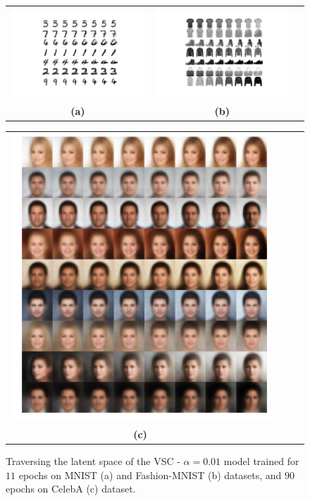 \begin{figure}[!h]
    \captionsetup{justification=centering,margin=0.3cm}
    \centering
    \begin{tabular}{ccc}
        \includegraphics[width=.47\textwidth]{figures/Mnist-traversal} &
        \includegraphics[width=.47\textwidth]{figures/Fashion-traversal} \\
        \textbf{(a)} & \textbf{(b)} \\ [6pt] 
     \end{tabular}
     
     \centering
     \begin{tabular}{cccc}
          \includegraphics[width=.60\textwidth]{figures/CelebA_Traversal} \\
          \textbf{(c)} \\ [6pt] 
     \end{tabular}
   
    \centering
    \caption{Traversing the latent space of the VSC - $\alpha = 0.01$ model trained for $11$ epochs on MNIST (a) and Fashion-MNIST (b) datasets, and $90$ epochs on CelebA (c) dataset.}
    \label{fig:traversals}
\end{figure}

